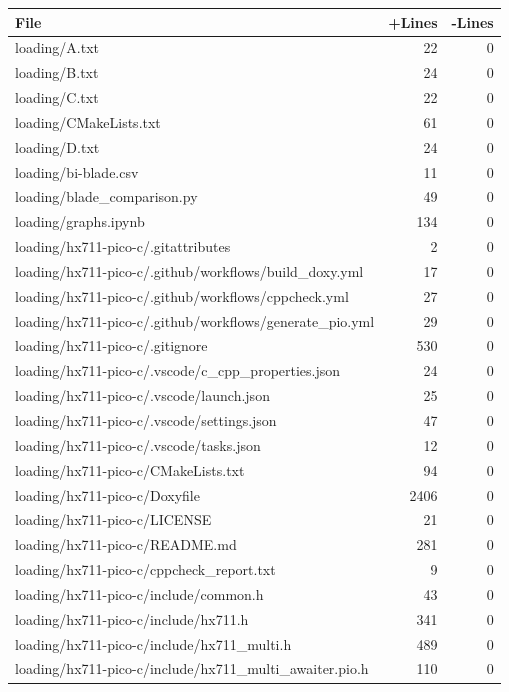 \documentclass{article}
\begin{document}
\begin{longtable}{|p{10cm}|r|r|}
\hline \textbf{File} & \textbf{+Lines} & \textbf{-Lines} \\
\hline
loading/A.txt & 22 & 0 \\
\hline
loading/B.txt & 24 & 0 \\
\hline
loading/C.txt & 22 & 0 \\
\hline
loading/CMakeLists.txt & 61 & 0 \\
\hline
loading/D.txt & 24 & 0 \\
\hline
loading/bi-blade.csv & 11 & 0 \\
\hline
loading/blade\_comparison.py & 49 & 0 \\
\hline
loading/graphs.ipynb & 134 & 0 \\
\hline
loading/hx711-pico-c/.gitattributes & 2 & 0 \\
\hline
loading/hx711-pico-c/.github/workflows/build\_doxy.yml & 17 & 0 \\
\hline
loading/hx711-pico-c/.github/workflows/cppcheck.yml & 27 & 0 \\
\hline
loading/hx711-pico-c/.github/workflows/generate\_pio.yml & 29 & 0 \\
\hline
loading/hx711-pico-c/.gitignore & 530 & 0 \\
\hline
loading/hx711-pico-c/.vscode/c\_cpp\_properties.json & 24 & 0 \\
\hline
loading/hx711-pico-c/.vscode/launch.json & 25 & 0 \\
\hline
loading/hx711-pico-c/.vscode/settings.json & 47 & 0 \\
\hline
loading/hx711-pico-c/.vscode/tasks.json & 12 & 0 \\
\hline
loading/hx711-pico-c/CMakeLists.txt & 94 & 0 \\
\hline
loading/hx711-pico-c/Doxyfile & 2406 & 0 \\
\hline
loading/hx711-pico-c/LICENSE & 21 & 0 \\
\hline
loading/hx711-pico-c/README.md & 281 & 0 \\
\hline
loading/hx711-pico-c/cppcheck\_report.txt & 9 & 0 \\
\hline
loading/hx711-pico-c/include/common.h & 43 & 0 \\
\hline
loading/hx711-pico-c/include/hx711.h & 341 & 0 \\
\hline
loading/hx711-pico-c/include/hx711\_multi.h & 489 & 0 \\
\hline
loading/hx711-pico-c/include/hx711\_multi\_awaiter.pio.h & 110 & 0 \\

\end{longtable}
\end{document}

